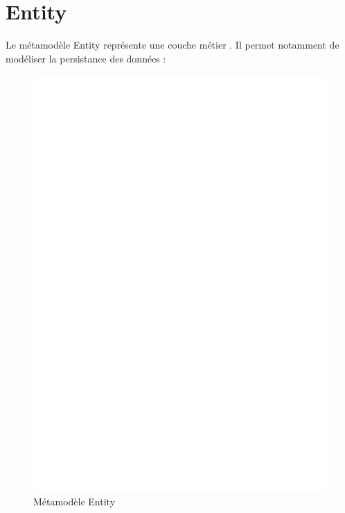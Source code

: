 \section{Entity}\label{sub:ent}
Le métamodèle Entity représente une couche \og métier \fg{}. Il permet notamment de modéliser la persistance des données :  

\begin{figure}[htb]
  \centering
  \includegraphics[scale=.3]{img/Entity.eps}
  \caption{Métamodèle Entity}
  \label{fig:ent}
\end{figure}


\clearpage

